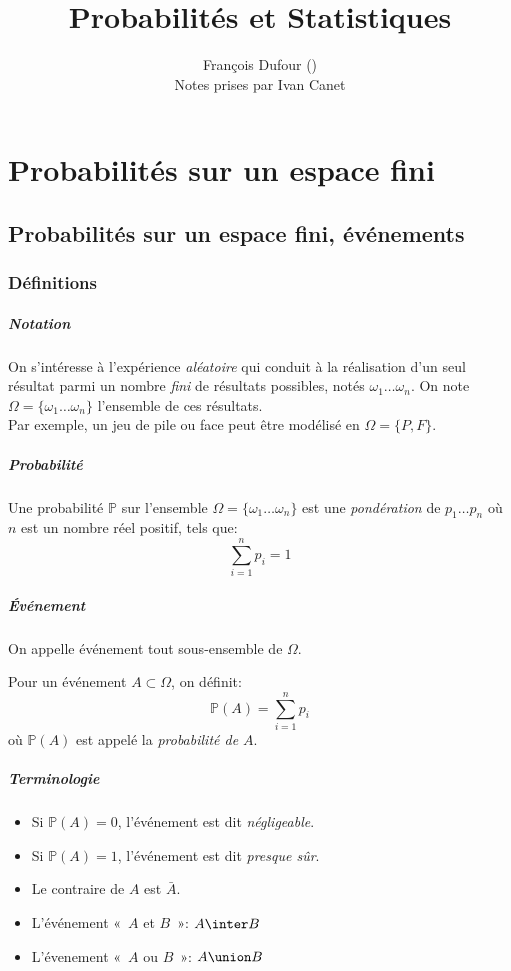 \documentclass[a4paper,10pt,french,openany]{memoir}
\title{Probabilités et Statistiques}
\author{François Dufour (\hrefu{mailto://francois.dufour@math.u-bordeaux.fr}{francois.dufour@math.u-bordeaux.fr})\\Notes prises par Ivan Canet}
\newcommand{\Proba}{\mathbb{P}}
\begin{document}
\maketitle
\tableofcontents

\chapter{Probabilités sur un espace fini}
\section{Probabilités sur un espace fini, événements}
\subsection{Définitions}

\paragraph{Notation}
On s'intéresse à l'expérience \emph{aléatoire} qui conduit à la réalisation d'un seul résultat parmi un nombre \emph{fini} de résultats possibles, notés $\omega_1\dots \omega_n$. On note $\Omega = \lbrace \omega_1\dots\omega_n \rbrace$ l'ensemble de ces résultats.\\
Par exemple, un jeu de pile ou face peut être modélisé en $\Omega = \lbrace P, F \rbrace$.

\paragraph{Probabilité}
Une probabilité $\Proba$ sur l'ensemble $\Omega = \lbrace \omega_1\dots\omega_n \rbrace$ est une \emph{pondération} de $p_1\dots p_n$ où $n$ est un nombre réel positif, tels que:
\[\sum_{i=1}^n p_i = 1\]

\paragraph{Événement}
On appelle événement tout sous-ensemble de $\Omega$.

Pour un événement $A \subset \Omega$, on définit:
\[\Proba(A) = \sum_{i=1}^n p_i\]
où $\Proba(A)$ est appelé la \emph{probabilité de $A$}.

\paragraph{Terminologie}
\begin{itemize}
 \item Si $\Proba(A)=0$, l'événement est dit \emph{négligeable}.
 \item Si $\Proba(A)=1$, l'événement est dit \emph{presque sûr}.
 \item Le contraire de $A$ est $\bar{A}$.
 \item L'événement «~$A$ et $B$~»: $A \inter B$
 \item L'évenement «~$A$ ou $B$~»: $A \union B$
\end{itemize}
\end{document}

